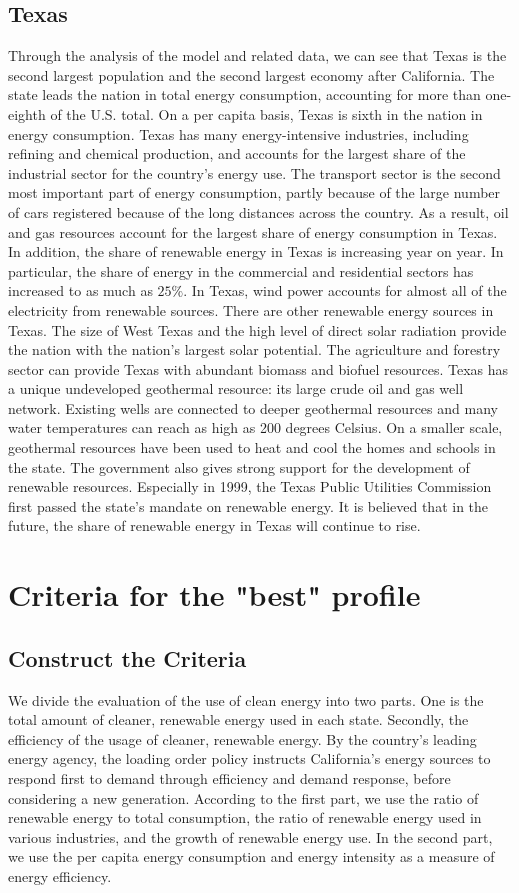 \documentclass{mcmthesis}
\begin{document}
\subsection{Texas}
Through the analysis of the model and related data, we can see that Texas is the second largest population and the second largest economy after California.
The state leads the nation in total energy consumption, accounting for more than one-eighth of the U.S. total.
On a per capita basis, Texas is sixth in the nation in energy consumption.
Texas has many energy-intensive industries, including refining and chemical production, and accounts for the largest share of the industrial sector for the country's energy use.
The transport sector is the second most important part of energy consumption, partly because of the large number of cars registered because of the long distances across the country.
As a result, oil and gas resources account for the largest share of energy consumption in Texas. In addition, the share of renewable energy in Texas is increasing year on year.
In particular, the share of energy in the commercial and residential sectors has increased to as much as $25\%$.
In Texas, wind power accounts for almost all of the electricity from renewable sources. There are other renewable energy sources in Texas.
The size of West Texas and the high level of direct solar radiation provide the nation with the nation's largest solar potential.
The agriculture and forestry sector can provide Texas with abundant biomass and biofuel resources.
Texas has a unique undeveloped geothermal resource: its large crude oil and gas well network.
Existing wells are connected to deeper geothermal resources and many water temperatures can reach as high as 200 degrees Celsius.
On a smaller scale, geothermal resources have been used to heat and cool the homes and schools in the state.
The government also gives strong support for the development of renewable resources.
Especially in 1999, the Texas Public Utilities Commission first passed the state's mandate on renewable energy.
It is believed that in the future, the share of renewable energy in Texas will continue to rise.

\section{Criteria for the "best" profile}
\subsection{Construct the Criteria}
We divide the evaluation of the use of clean energy into two parts.
One is the total amount of cleaner, renewable energy used in each state.
Secondly, the efficiency of the usage of cleaner, renewable energy.
By the country's leading energy agency, the loading order policy instructs California's energy sources to respond first to demand through efficiency and demand response,
before considering a new generation.
According to the first part, we use the ratio of renewable energy to total consumption, the ratio of renewable energy used in various industries,
and the growth of renewable energy use. In the second part, we use the per capita energy consumption and energy intensity as a measure of energy efficiency.
\end{document}
